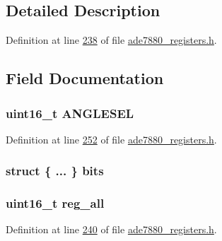 \subsection{Detailed Description}


Definition at line \hyperlink{a00036_source_l00238}{238} of file \hyperlink{a00036_source}{ade7880\-\_\-registers.\-h}.



\subsection{Field Documentation}
\hypertarget{a00021_a4877943f30711d8b2dcd86bb449e5eba}{
\subsubsection[{A\-N\-G\-L\-E\-S\-E\-L}]{\setlength{\rightskip}{0pt plus 5cm}uint16\-\_\-t A\-N\-G\-L\-E\-S\-E\-L}}\label{de/d11/a00021_a4877943f30711d8b2dcd86bb449e5eba}


Definition at line \hyperlink{a00036_source_l00252}{252} of file \hyperlink{a00036_source}{ade7880\-\_\-registers.\-h}.

\hypertarget{a00021_adcc1b05e99ccb27a811df890d7f3f420}{
\subsubsection[{bits}]{\setlength{\rightskip}{0pt plus 5cm}struct \{ ... \}  bits}}\label{de/d11/a00021_adcc1b05e99ccb27a811df890d7f3f420}
\hypertarget{a00021_a74e4d0cc3da3b66723322f38bfb7f371}{
\subsubsection[{reg\-\_\-all}]{\setlength{\rightskip}{0pt plus 5cm}uint16\-\_\-t reg\-\_\-all}}\label{de/d11/a00021_a74e4d0cc3da3b66723322f38bfb7f371}


Definition at line \hyperlink{a00036_source_l00240}{240} of file \hyperlink{a00036_source}{ade7880\-\_\-registers.\-h}.

